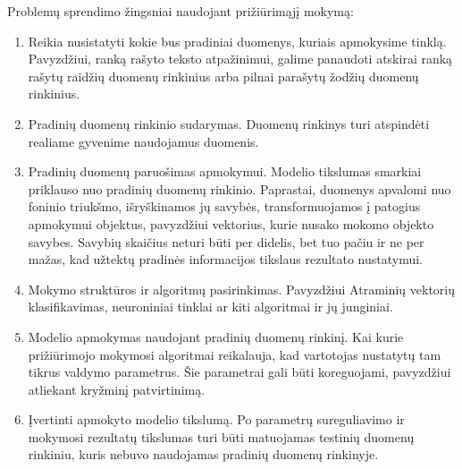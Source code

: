 \documentclass{VUMIFInfBakalaurinis}
\begin{document}
Problemų sprendimo žingsniai naudojant prižiūrimąjį mokymą:
\begin{enumerate}
  \item Reikia nusistatyti kokie bus pradiniai duomenys, kuriais apmokysime tinklą. Pavyzdžiui, ranką rašyto teksto atpažinimui, galime panaudoti atskirai ranką rašytų raidžių duomenų rinkinius arba pilnai parašytų žodžių duomenų rinkinius.
  \item Pradinių duomenų rinkinio sudarymas. Duomenų rinkinys turi atspindėti realiame gyvenime naudojamus duomenis.
  \item Pradinių duomenų paruošimas apmokymui. Modelio tikslumas smarkiai priklauso nuo pradinių duomenų rinkinio. Paprastai, duomenys apvalomi nuo foninio triukšmo, išryškinamos jų savybės, transformuojamos į patogius apmokymui objektus, pavyzdžiui vektorius, kurie nusako mokomo objekto savybes. Savybių skaičius neturi būti per didelis, bet tuo pačiu ir ne per mažas, kad užtektų pradinės informacijos tikslaus rezultato nustatymui.
  \item Mokymo struktūros ir algoritmų pasirinkimas. Pavyzdžiui Atraminių vektorių klasifikavimas, neuroniniai tinklai ar kiti algoritmai ir jų junginiai.
  \item Modelio apmokymas naudojant pradinių duomenų rinkinį. Kai kurie prižiūrimojo mokymosi algoritmai reikalauja, kad vartotojas nustatytų tam tikrus valdymo parametrus. Šie parametrai gali būti koreguojami, pavyzdžiui atliekant kryžminį patvirtinimą.
  \item Įvertinti apmokyto modelio tikslumą. Po parametrų sureguliavimo ir mokymosi rezultatų tikslumas turi būti matuojamas testinių duomenų rinkiniu, kuris nebuvo naudojamas pradinių duomenų rinkinyje.
\end{enumerate}
\end{document}
